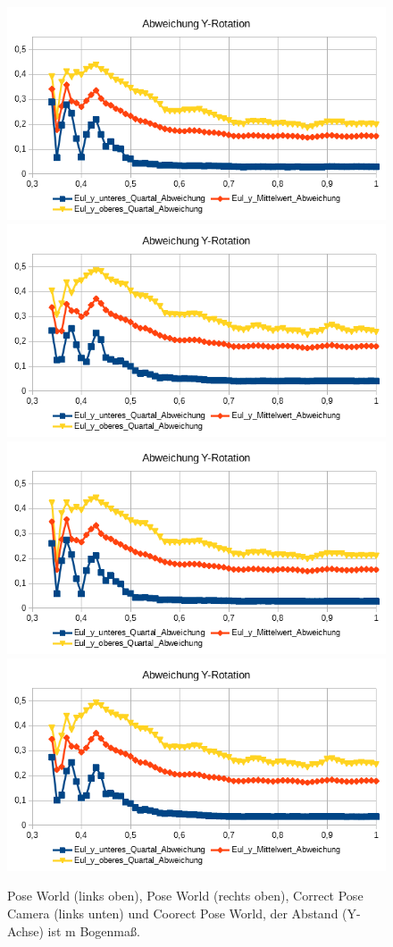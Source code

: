 \begin{figure}
	\centering
	\includegraphics[width=0.45\linewidth]{tabelle/Y_Rot_PC}
	\includegraphics[width=0.45\linewidth]{tabelle/Y_Rot_PW}
	\includegraphics[width=0.45\linewidth]{tabelle/Y_Rot_CPC}
	\includegraphics[width=0.45\linewidth]{tabelle/Y_Rot_CPW}
	\caption{Pose World (links oben), Pose World (rechts oben), Correct Pose Camera (links unten) und Coorect Pose World, der Abstand (Y-Achse) ist m Bogenmaß.}
	\label{img_Y_Pot}
\end{figure}
